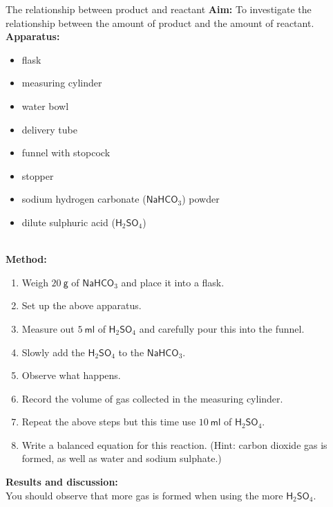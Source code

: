 \begin{g_experiment}{The relationship between product and reactant}
\textbf{Aim:} To investigate the relationship between the amount of product and the amount of reactant.\\
\textbf{Apparatus:}\\
\begin{minipage}{.5\textwidth}
 \begin{itemize}[noitemsep]
  \item flask
\item measuring cylinder
\item water bowl
\item delivery tube
\item funnel with stopcock
\item stopper
\item sodium hydrogen carbonate ($\mathsf{NaHCO}_{3}$) powder
\item dilute sulphuric acid ($\mathsf{H}_{2}\mathsf{SO}_{4}$)
 \end{itemize}
\end{minipage}
\begin{minipage}{.5\textwidth}
\begin{center}
\end{center}
\end{minipage} \\
\textbf{Method:} 
\begin{enumerate}[noitemsep,label=\textbf{\arabic*}]
 \item Weigh $20~\mathsf{g}$ of $\mathsf{NaHCO}_{3}$ and place it into a flask.
\item Set up the above apparatus.
\item Measure out $5~\mathsf{ml}$ of $\mathsf{H}_{2}\mathsf{SO}_{4}$ and carefully pour this into the funnel.
\item Slowly add the $\mathsf{H}_{2}\mathsf{SO}_{4}$ to the $\mathsf{NaHCO}_{3}$.
\item Observe what happens.
\item Record the volume of gas collected in the measuring cylinder.
\item Repeat the above steps but this time use $10~\mathsf{ml}$ of $\mathsf{H}_{2}\mathsf{SO}_{4}$.
\item Write a balanced equation for this reaction. (Hint: carbon dioxide gas is formed, as well as water and sodium sulphate.)
\end{enumerate}
\textbf{Results and discussion:}\\
You should observe that more gas is formed when using the more $\mathsf{H}_{2}\mathsf{SO}_{4}$. 
\end{g_experiment}

